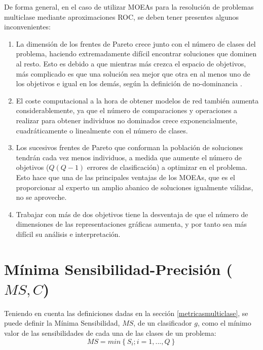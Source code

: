 De forma general, en el caso de utilizar MOEAs para la resolución de problemas multiclase
mediante aproximaciones ROC, se deben tener presentes algunos inconvenientes:
\begin{enumerate}
	\item La dimensión de los frentes de Pareto crece junto con el número de clases del
	problema, haciendo extremadamente difícil encontrar soluciones que dominen al resto.
	Esto es debido a que mientras más crezca el espacio
	de objetivos, más complicado es que una solución sea mejor que otra en al menos uno
	de los objetivos e igual en los demás, según la definición de no-dominancia
	\cite{Coello2007}.
	\item El coste computacional a la hora de obtener modelos de red también aumenta
	considerablemente, ya que el número de comparaciones y operaciones a realizar para
	obtener individuos no dominados crece exponencialmente, cuadráticamente o
	linealmente con el número de clases.
	\item Los	sucesivos	frentes de Pareto que conforman la población de
	soluciones tendrán	cada vez menos individuos, a medida que aumente el número de
	objetivos ($Q(Q-1)$ errores de	clasificación) a optimizar en el problema. Esto
	hace que una de las principales	ventajas de los MOEAs, que es el proporcionar al
	experto un amplio abanico de	soluciones igualmente válidas, no se aproveche.
	\item Trabajar con más de dos objetivos tiene la desventaja de que el número
	de dimensiones de las representaciones gráficas aumenta, y por tanto sea más
	difícil su análisis e interpretación.
	\end{enumerate}


\section{Mínima Sensibilidad-Precisión ($MS,C$)}\label{ms-c}
\noindent Teniendo en cuenta las definiciones dadas en la sección
\ref{metricasmulticlase}, se puede definir la Mínima Sensibilidad, $MS$, de un
clasificador $g$, como el mínimo valor de las sensibilidades de cada una de las clases
de un problema:
\begin{displaymath}
MS=min\left\lbrace S_{i};i=1,...,Q\right\rbrace
\end{displaymath}


